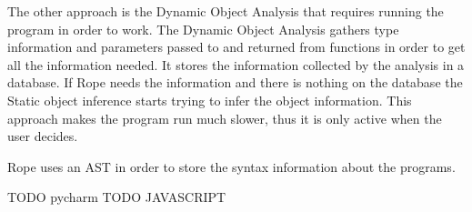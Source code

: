 
The other approach is the Dynamic Object Analysis that requires running
the program in order to work.
The Dynamic Object Analysis gathers type information and parameters passed to and returned from
functions in order to get all the information needed.
It stores the information collected by the analysis in a database.
If Rope needs the information and there is nothing on the database the Static
object inference starts trying to infer the object information.
This approach makes the program run much slower, thus it is only active when
the user decides.

Rope uses an AST in order to store the syntax information about the programs.

TODO pycharm
TODO JAVASCRIPT
